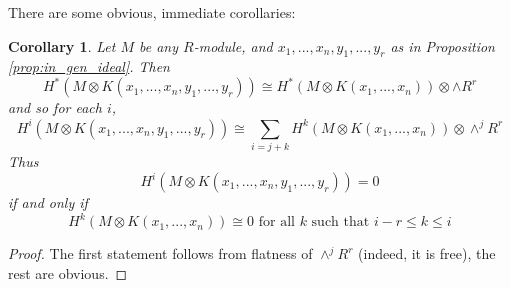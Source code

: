 \documentclass[12pt]{article}
\theoremstyle{plain}
\newtheorem{cor}[thm]{Corollary}
\theoremstyle{definition}
\begin{document}
There are some obvious, immediate corollaries:
\begin{cor}
Let $M$ be any $R$-module, and $x_1,...,x_n,y_1,...,y_r$ as in Proposition \ref{prop:in_gen_ideal}. Then
\begin{equation}
H^\ast (M \otimes K(x_1,...,x_n,y_1,...,y_r))\cong H^\ast(M \otimes K(x_1,...,x_n)) \otimes \wedge R^r
\end{equation}
and so for each $i$,
\begin{equation}
H^i(M \otimes K(x_1,...,x_n,y_1,...,y_r)) \cong \sum_{i = j + k}H^k(M \otimes K(x_1,...,x_n)) \otimes \wedge^j R^r
\end{equation}
Thus
\begin{equation}
H^i(M \otimes K(x_1,...,x_n,y_1,...,y_r)) = 0
\end{equation}
if and only if
\begin{equation}
H^k(M \otimes K(x_1,...,x_n)) \cong 0\text{ for all }k\text{ such that }i-r \leq k \leq i
\end{equation}
\end{cor}
\begin{proof}
The first statement follows from flatness of $\wedge^j R^r$ (indeed, it is free), the rest are obvious.
\end{proof}
\end{document}

